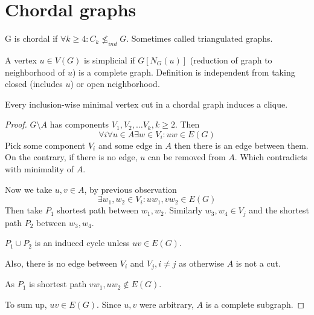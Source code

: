 \section{\texorpdfstring{Chordal graphs}{Chordal graphs}}
\vspace{5mm}
\large

\begin{definition}
	G is chordal if $\forall k \geq 4: C_k \not\leq_{ind} G$.
	Sometimes called triangulated graphs.
\end{definition}

\begin{definition}[Simplicial]
	A vertex $u \in V(G)$ is simplicial  if $G[N_G(u)]$ (reduction of graph to neighborhood of $u$) is a complete graph.
	Definition is independent from taking closed (includes $u$) or open neighborhood.
\end{definition}

\begin{lemma}[1]
	Every inclusion-wise minimal vertex cut in a chordal graph induces a clique.
\end{lemma}
\begin{proof}
	$G\setminus A$ has components $V_1, V_2, \ldots V_k, k \geq 2$.
	Then
	\[ \forall i \forall u \in A \exists w \in V_i: uw \in E(G) \]
	Pick some component $V_i$ and some edge in $A$ then there is an edge between them.
	On the contrary, if there is no edge, $u$ can be removed from $A$.
	Which contradicts with minimality of $A$.

	Now we take $u, v \in A$, by previous observation
	\[ \exists w_1, w_2 \in V_i: uw_1, vw_2 \in E(G) \]
	Then take $P_1$ shortest path between $w_1, w_2$.
	Similarly $w_3, w_4 \in V_j$ and the shortest path $P_2$ between $w_3, w_4$.

	$P_1 \cup P_2$ is an induced cycle unless $uv \in E(G)$.

	Also, there is no edge between $V_i$ and $V_j, i \ne j$ as otherwise $A$ is not a cut.

	As $P_1$ is shortest path $vw_1, uw_2 \notin E(G)$.

	To sum up, $uv \in E(G)$.
	Since $u,v$ were arbitrary, $A$ is a complete subgraph.
\end{proof}

